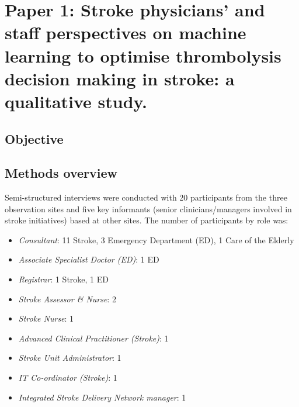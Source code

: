 \section{Paper 1: Stroke physicians' and staff perspectives on machine learning to optimise thrombolysis decision making in stroke: a qualitative study. \cite{jarvie_stroke_2024}}\label{sec:paper_1}

\subsection{Objective}

\subsection{Methods overview}

Semi-structured interviews were conducted with 20 participants from the three observation sites and five key informants (senior clinicians/managers involved in stroke initiatives) based at other sites. The number of participants by role was:

\begin{itemize}

    \item \textit{Consultant}: 11 Stroke, 3 Emergency Department (ED), 1 Care of the Elderly

    \item \textit{Associate Specialist Doctor (ED)}: 1 ED

    \item \textit{Registrar}: 1 Stroke, 1 ED 

    \item \textit{Stroke Assessor \& Nurse}: 2

    \item \textit{Stroke Nurse}: 1
    
    \item \textit{Advanced Clinical Practitioner (Stroke)}: 1

    \item \textit{Stroke Unit Administrator}: 1

    \item \textit{IT Co-ordinator (Stroke)}: 1

    \item \textit{Integrated Stroke Delivery Network manager}: 1
    
\end{itemize}

